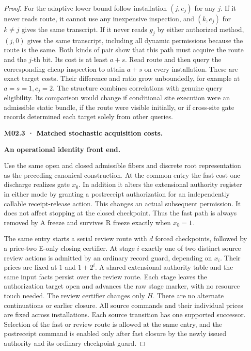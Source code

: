 \begin{proof}
For the adaptive lower bound follow installation \((j,e_j)\) for any \(j\). If it never reads route, it cannot use any inexpensive inspection, and \((k,e_j)\) for \(k\ne j\) gives the same transcript. If it never reads \(g_j\) by either authorized method, \((j,0)\) gives the same transcript, including all dynamic permissions because the route is the same. Both kinds of pair show that this path must acquire the route and the \(j\)-th bit. Its cost is at least \(a+s\). Read route and then query the corresponding cheap inspection to attain \(a+s\) on every installation. These are exact target costs. Their difference and ratio grow unboundedly, for example at \(a=s=1,c_j=2\). The structure combines correlations with genuine query eligibility. Its comparison would change if conditional site execution were an admissible static bundle, if the route were visible initially, or if cross-site gate records determined each target solely from other queries.

\textbf{M02.3 · Matched stochastic acquisition costs.}

\textbf{An operational identity front end.}

Use the same open and closed admissible fibers and discrete root representation as the preceding canonical construction. At the common entry the fast cost-one discharge realizes gate \(x_0\). In addition it alters the extensional authority register in either mode by granting a postreceipt authorization for an independently callable receipt-release action. This changes an actual subsequent permission. It does not affect stopping at the closed checkpoint. Thus the fast path is always removed by A freeze and survives R freeze exactly when \(x_0=1\).

The same entry starts a serial review route with \(d\) forced checkpoints, followed by a price-two E-only closing certifier. At stage \(i\) exactly one of two distinct source review actions is admitted by an ordinary record guard, depending on \(x_i\). Their prices are fixed at \(1\) and \(1+2^i\). A shared extensional authority table and the same input facts persist over the review route. Each stage leaves the authorization target open and advances the raw stage marker, with no resource touch needed. The review certifier changes only \(H\). There are no alternate continuations or earlier closure. All source commands and their individual prices are fixed across installations. Each source transition has one supported successor. Selection of the fast or review route is allowed at the same entry, and the postreceipt command is enabled only after fast closure by the newly issued authority and its ordinary checkpoint guard.


\end{proof}

